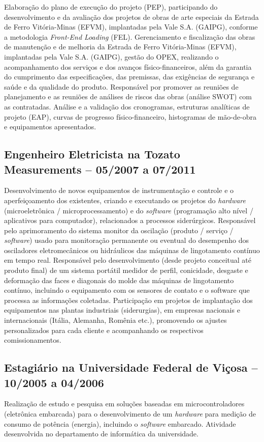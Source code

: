 \documentclass[]{article}
\begin{document}
Elaboração do plano de execução do projeto (PEP), participando do
desenvolvimento e da avaliação dos projetos de obras de arte especiais
da Estrada de Ferro Vitória-Minas (EFVM), implantadas pela Vale S.A.
(GAIPG), conforme a metodologia \emph{Front-End Loading} (FEL).
Gerenciamento e fiscalização das obras de manutenção e de melhoria da
Estrada de Ferro Vitória-Minas (EFVM), implantadas pela Vale S.A.
(GAIPG), gestão do OPEX, realizando o acompanhamento dos serviços e dos
avanços físico-financeiros, além da garantia do cumprimento das
especificações, das premissas, das exigências de segurança e saúde e da
qualidade do produto. Responsável por promover as reuniões de
planejamento e as reuniões de análises de riscos das obras (análise
SWOT) com as contratadas. Análise e a validação dos cronogramas,
estruturas analíticas de projeto (EAP), curvas de progresso
físico-financeiro, histogramas de mão-de-obra e equipamentos
apresentados.

\subsection{Engenheiro Eletricista na Tozato Measurements -- 05/2007 a
07/2011}\label{engenheiro-eletricista-na-tozato-measurements-052007-a-072011}

Desenvolvimento de novos equipamentos de instrumentação e controle e o
aperfeiçoamento dos existentes, criando e executando os projetos do
\emph{hardware} (microeletrônica / microprocessamento) e do
\emph{software} (programação alto nível / aplicativos para computador),
relacionados a processos siderúrgicos. Responsável pelo aprimoramento do
sistema monitor da oscilação (produto / serviço / \emph{software}) usado
para monitoração permanente ou eventual do desempenho dos osciladores
eletromecânicos ou hidráulicos das máquinas de lingotamento contínuo em
tempo real. Responsável pelo desenvolvimento (desde projeto conceitual
até produto final) de um sistema portátil medidor de perfil, conicidade,
desgaste e deformação das faces e diagonais do molde das máquinas de
lingotamento contínuo, incluindo o equipamento com os sensores de
contato e o software que processa as informações coletadas. Participação
em projetos de implantação dos equipamentos nas plantas industriais
(siderurgias), em empresas nacionais e internacionais (Itália, Alemanha,
Romênia etc.), promovendo os ajustes personalizados para cada cliente e
acompanhando os respectivos comissionamentos.

\subsection{Estagiário na Universidade Federal de Viçosa -- 10/2005 a
04/2006}\label{estagiuxe1rio-na-universidade-federal-de-viuxe7osa-102005-a-042006}

Realização de estudo e pesquisa em soluções baseadas em
microcontroladores (eletrônica embarcada) para o desenvolvimento de um
\emph{hardware} para medição de consumo de potência (energia), incluindo
o \emph{software} embarcado. Atividade desenvolvida no departamento de
informática da universidade.
\end{document}
